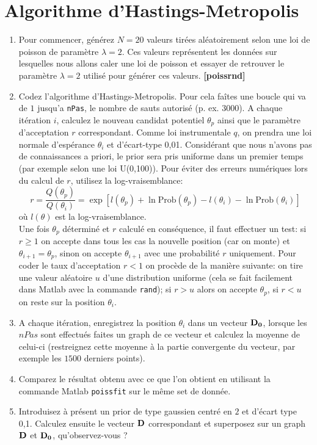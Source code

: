 \documentclass[a4paper]{article}
\begin{document}
\section{Algorithme d'Hastings-Metropolis}
\begin{enumerate}
	\item Pour commencer, générez $N=20$ valeurs tirées aléatoirement selon une loi de poisson de paramètre $\lambda=2$. Ces valeurs représentent les données sur lesquelles nous allons caler une loi de poisson et essayer de retrouver le paramètre $\lambda=2$ utilisé pour générer ces valeurs. \textbf{[poissrnd]}
	\item Codez l'algorithme d'Hastings-Metropolis. Pour cela faîtes une boucle qui va de $1$ jusqu'a \texttt{nPas}, le nombre de sauts autorisé (p. ex. $3000$). A chaque itération $i$, calculez le nouveau candidat potentiel $\theta_{p}$ ainsi que le paramètre d'acceptation $r$ correspondant.
Comme loi instrumentale $q$, on prendra une loi normale d'espérance $\theta_{i}$ et d'écart-type 0,01. Considérant que nous n'avons pas de connaissances a priori, le prior sera pris uniforme dans un premier temps (par exemple selon une loi U(0,100)). Pour éviter des erreurs numériques lors du calcul de $r$, utilisez la log-vraisemblance:
	\[
	r=\frac{Q(\theta_{p})}{Q(\theta_{i})}= \exp\left[ l(\theta_{p})+\ln \textrm{Prob}(\theta_{p})-l(\theta_{i})-\ln \textrm{Prob}(\theta_{i})\right]
	\]
	où $l(\theta)$ est la log-vraisemblance.\\ Une fois $\theta_{p}$ déterminé et $r$ calculé en conséquence, il faut effectuer un test: si $r \geq 1$ on accepte dans tous les cas la nouvelle position (car on monte) et $\theta_{i+1}=\theta_{p}$, sinon on accepte  $\theta_{i+1}$ avec une probabilité $r$ uniquement. Pour coder le taux d'acceptation $r<1$ on procède de la manière suivante: on tire une valeur aléatoire $u$ d'une distribution uniforme (cela se fait facilement dans Matlab avec la commande \texttt{rand}); si $r>u$ alors on accepte  $\theta_{p}$, si $r<u$ on reste sur la position $\theta_{i}$.
	\item A chaque itération, enregistrez la position $\theta_{i}$ dans un vecteur $\bold{D_{0}}$, lorsque les $nPas$ sont effectués faites un graph de ce vecteur et calculez la moyenne de celui-ci (restreignez cette moyenne à la partie convergente du vecteur, par exemple les $1500$ derniers points).
	\item Comparez le résultat obtenu avec ce que l'on obtient en utilisant la commande Matlab \texttt{poissfit} sur le même set de donnée.
	\item Introduisez à présent un prior de type gaussien centré en $2$ et d'écart type 0,1. Calculez ensuite le vecteur $\bold{D}$ correspondant et superposez sur un graph $\bold{D}$ et $\bold{D_{0}}$, qu'observez-vous ?

\end{enumerate}
\end{document}
